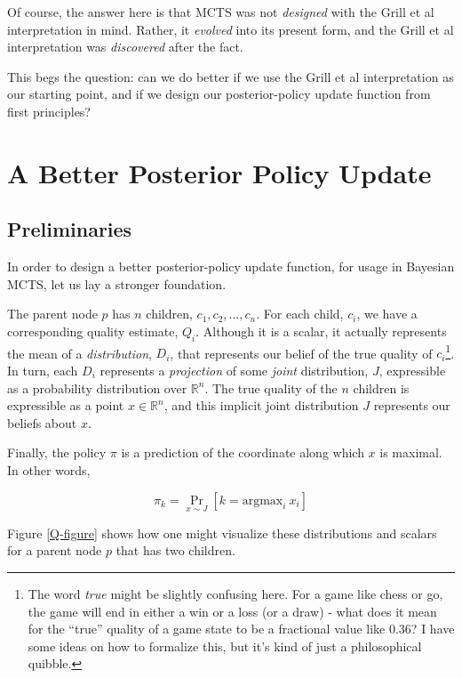 \documentclass[tikz]{article}
\newcommand{\argmax}{\mathrm{argmax}}
\begin{document}
Of course, the answer here is that MCTS was not \textit{designed} with the Grill et al interpretation in mind. Rather, it \textit{evolved} into
its present form, and the Grill et al interpretation was \textit{discovered} after the fact. \newline

This begs the question: can we do better if we use the Grill et al interpretation as our starting point, and if we design our posterior-policy update
function from first principles?

\section{A Better Posterior Policy Update}

\subsection{Preliminaries}

In order to design a better posterior-policy update function, for usage in Bayesian MCTS, let us lay a stronger foundation. \newline

The parent node $p$ has $n$ children, $c_1, c_2, \ldots, c_n$. For each child, $c_i$, we have a corresponding
quality estimate, $Q_i$.
Although it is a scalar, it actually represents the mean of a \emph{distribution}, $D_i$, that represents our belief of the
true quality of $c_i$\footnote{The word \emph{true} might be slightly confusing here. For a game like chess or go, the game will
end in either a win or a loss (or a draw) - what does it mean for the ``true'' quality of a game state to be a fractional value like 0.36?
I have some ideas on how to formalize this, but it's kind of just a philosophical quibble.}.
In turn, each $D_i$ represents a \emph{projection} of some \emph{joint} distribution, $J$, expressible as
a probability distribution over $\mathbb{R}^n$. The true quality of the $n$ children is expressible as a point $x \in \mathbb{R}^n$,
and this implicit joint distribution $J$ represents our beliefs about $x$.\newline

Finally, the policy $\pi$ is a prediction of the coordinate along which $x$ is maximal. In other words,

$$
\pi_k = \Pr_{x \sim J}[k = \argmax_i\ x_i]
$$

Figure \ref{Q-figure} shows how one might visualize these distributions and scalars for a parent node $p$ that has two children. 
\end{document}
